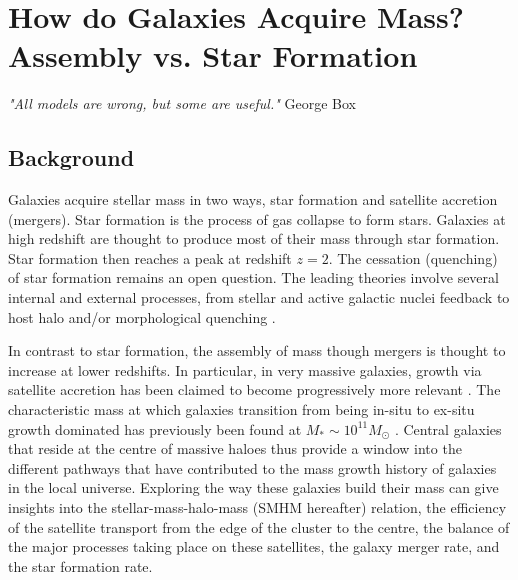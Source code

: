 

\chapter{How do Galaxies Acquire Mass? Assembly vs. Star Formation} %
\label{Chapter:GalGrowth}
\begin{center}
    \textit{"All models are wrong, but some are useful."}
    George Box
\end{center}

\section{Background}
Galaxies acquire stellar mass in two ways, star formation and satellite accretion (mergers). Star formation is the process of gas collapse to form stars. Galaxies at high redshift are thought to produce most of their mass through star formation. Star formation then reaches a peak at redshift $z=2$. The cessation (quenching) of star formation remains an open question. The leading theories involve several internal and external processes, from stellar and active galactic nuclei feedback to host halo and/or morphological quenching \citep{Granato2004AHosts, Dekel2009ColdFormation, Lilly2013GASHALOS, Schawinski2014TheGalaxies}. 

In contrast to star formation, the assembly of mass though mergers is thought to increase at lower redshifts. In particular, in very massive galaxies, growth via satellite accretion has been claimed to become progressively more relevant \citep{DeLucia2006TheGalaxies,vanDokkum2010THE2, Shankar2013SizeUniverse, Shankar2015, Buchan2016, Groenewald2017TheGrowth, Matharu2019HST/WFC3Mergers}. The characteristic mass at which galaxies transition from being in-situ to ex-situ growth dominated has previously been found at $M_* \sim 10^{11} M_{\odot}$ \citep{Cattaneo2011HowMass, Bernardi2011EvidenceRelations, Shankar2013SizeUniverse}. Central galaxies that reside at the centre of massive haloes thus provide a window into the different pathways that have contributed to the mass growth history of galaxies in the local universe. Exploring the way these galaxies build their mass can give insights into the stellar-mass-halo-mass (SMHM hereafter) relation, the efficiency of the satellite transport from the edge of the cluster to the centre, the balance of the major processes taking place on these satellites, the galaxy merger rate, and the star formation rate.


